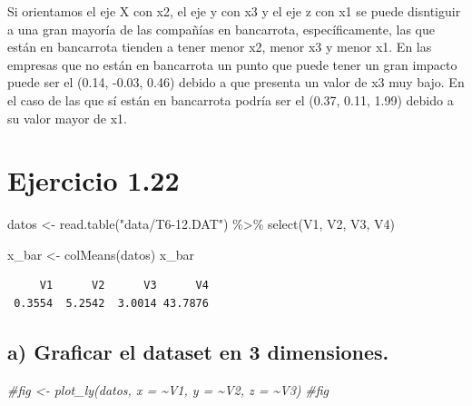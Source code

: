 \documentclass[
]{article}
\newenvironment{Shaded}{\begin{snugshade}}{\end{snugshade}}
\newcommand{\CommentTok}[1]{\textcolor[rgb]{0.56,0.35,0.01}{\textit{#1}}}
\newcommand{\FunctionTok}[1]{\textcolor[rgb]{0.00,0.00,0.00}{#1}}
\newcommand{\NormalTok}[1]{#1}
\newcommand{\OtherTok}[1]{\textcolor[rgb]{0.56,0.35,0.01}{#1}}
\newcommand{\SpecialCharTok}[1]{\textcolor[rgb]{0.00,0.00,0.00}{#1}}
\newcommand{\StringTok}[1]{\textcolor[rgb]{0.31,0.60,0.02}{#1}}
\begin{document}
Si orientamos el eje X con x2, el eje y con x3 y el eje z con x1 se
puede disntiguir a una gran mayoría de las compañías en bancarrota,
específicamente, las que están en bancarrota tienden a tener menor x2,
menor x3 y menor x1. En las empresas que no están en bancarrota un punto
que puede tener un gran impacto puede ser el (0.14, -0.03, 0.46) debido
a que presenta un valor de x3 muy bajo. En el caso de las que sí están
en bancarrota podría ser el (0.37, 0.11, 1.99) debido a su valor mayor
de x1.

\hypertarget{ejercicio-1.22}{%
\section{Ejercicio 1.22}\label{ejercicio-1.22}}

\begin{Shaded}
\begin{Highlighting}[]
\NormalTok{datos }\OtherTok{\textless{}{-}} \FunctionTok{read.table}\NormalTok{(}\StringTok{"data/T6{-}12.DAT"}\NormalTok{) }\SpecialCharTok{\%\textgreater{}\%} \FunctionTok{select}\NormalTok{(V1, V2, V3, V4)}
\end{Highlighting}
\end{Shaded}

\begin{Shaded}
\begin{Highlighting}[]
\NormalTok{x\_bar }\OtherTok{\textless{}{-}} \FunctionTok{colMeans}\NormalTok{(datos)}
\NormalTok{x\_bar}
\end{Highlighting}
\end{Shaded}

\begin{verbatim}
     V1      V2      V3      V4 
 0.3554  5.2542  3.0014 43.7876 
\end{verbatim}

\hypertarget{a-graficar-el-dataset-en-3-dimensiones.}{%
\subsection{a) Graficar el dataset en 3
dimensiones.}\label{a-graficar-el-dataset-en-3-dimensiones.}}

\begin{Shaded}
\begin{Highlighting}[]
\CommentTok{\#fig \textless{}{-} plot\_ly(datos, x = \textasciitilde{}V1, y = \textasciitilde{}V2, z = \textasciitilde{}V3)}
\CommentTok{\#fig}
\end{Highlighting}
\end{Shaded}
\end{document}
